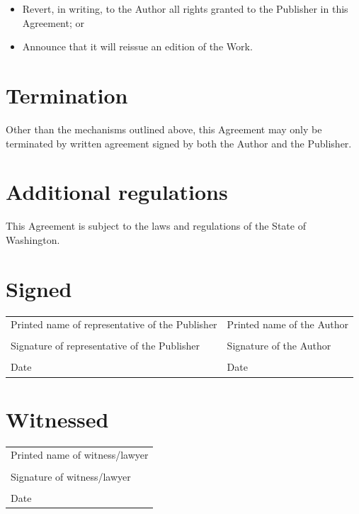 \documentclass[12pt,letterpaper]{article}
\begin{document}
\begin{itemize}
    \item Revert, in writing, to the Author all rights granted to the Publisher in this Agreement; or
    \item Announce that it will reissue an edition of the Work.
\end{itemize}

\section{Termination}

Other than the mechanisms outlined above, this Agreement may only be terminated by written agreement signed by both the Author and the Publisher.

\section{Additional regulations}

This Agreement is subject to the laws and regulations of the State of Washington.

\newpage

\thispagestyle{final}

\section*{Signed}

\begin{tabular}{p{3in} | p{3in}}
    \vspace{0.5in} & \\ \hline
    Printed name of representative of the Publisher & Printed name of the Author \\
    \vspace{0.5in} & \\ \hline
    Signature of representative of the Publisher & Signature of the Author \\
    \vspace{0.5in} & \\ \hline
    Date & Date \\
\end{tabular}

\section*{Witnessed}

\begin{tabular}{l}
    \vspace{0.5in} \\ \hline
    Printed name of witness/lawyer \\
    \vspace{0.5in} \\ \hline
    Signature of witness/lawyer \\
    \vspace{0.5in} \\ \hline
    Date \\
\end{tabular}
\end{document}
